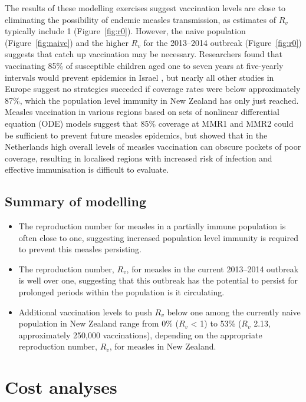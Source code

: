 \documentclass{article}
\begin{document}
The results of these modelling exercises suggest vaccination levels are close to eliminating the possibility of endemic measles transmission, as estimates of $R_v$ typically include 1 (Figure~\ref{fig:r0}). However, the naive population (Figure~\ref{fig:naive}) and the higher $R_v$ for the 2013--2014 outbreak (Figure~\ref{fig:r0}) suggests that catch up vaccination may be necessary. Researchers found that vaccinating 85\% of susceptible children aged one to seven years at five-yearly intervals would prevent epidemics in Israel \citep{agur93}, but nearly all other studies in Europe suggest no strategies succeded if coverage rates were below approximately 87\%, which the population level immunity in New Zealand has only just reached. Measles vaccination in various regions \citep{agur93, babad95, edmunds0, gay98, wallinga1} based on sets of nonlinear differential equation (ODE) models suggest that 85\% coverage at MMR1 and MMR2 could be sufficient to prevent future measles epidemics, but \citep{glass4} showed that in the Netherlands high overall levels of measles vaccination can obscure pockets of poor coverage, resulting in localised regions with increased risk of infection and effective immunisation is difficult to evaluate.

\subsection{Summary of modelling}
\begin{itemize}
\item The reproduction number for measles in a partially immune population is often close to one, suggesting increased population level immunity is required to prevent this measles persisting.
 \item The reproduction number, $R_v$, for measles in the current 2013--2014 outbreak is well over one, suggesting that this outbreak has the potential to persist for prolonged periods within the population is it circulating.
 \item Additional vaccination levels to push $R_v$ below one among the currently naive population in New Zealand range from 0\% ($R_v$ < 1) to 53\% ($R_v$ 2.13, approximately 250,000 vaccinations), depending on the appropriate reproduction number, $R_v$, for measles in New Zealand.
\end{itemize}

\section{Cost analyses}
\end{document}
